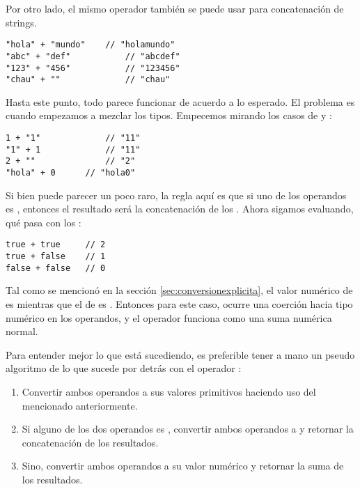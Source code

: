 Por otro lado, el mismo operador también se puede usar para concatenación de strings.

\begin{lstlisting}[title={Operador \code{+} en strings}]
"hola" + "mundo"	// "holamundo"
"abc" + "def"			// "abcdef"
"123" + "456"			// "123456"
"chau" + ""				// "chau"
\end{lstlisting}

Hasta este punto, todo parece funcionar de acuerdo a lo esperado. El problema es cuando empezamos a mezclar los tipos. Empecemos mirando los casos de  y :

\begin{lstlisting}[title={Operador \code{+} mezclando strings con números}]
1 + "1"				// "11"
"1" + 1				// "11"
2 + ""				// "2"
"hola" + 0		// "hola0"
\end{lstlisting}

Si bien puede parecer un poco raro, la regla aquí es que si uno de los operandos es , entonces el resultado será la concatenación de los . Ahora sigamos evaluando, qué pasa con los :

\begin{lstlisting}[title={Operador \code{+} en booleanos}]
true + true		// 2
true + false	// 1
false + false	// 0
\end{lstlisting}

Tal como se mencionó en la sección \ref{sec:conversionexplicita}, el valor numérico de  es  mientras que el de  es . Entonces para este caso, ocurre una coerción hacia tipo numérico en los operandos, y el operador \code{+} funciona como una suma numérica normal.

Para entender mejor lo que está sucediendo, es preferible tener a mano un pseudo algoritmo de lo que sucede por detrás con el operador \code{+}:

\begin{enumerate}
\item Convertir ambos operandos a sus valores primitivos haciendo uso del  mencionado anteriormente.
\item Si alguno de los dos operandos es , convertir ambos operandos a  y retornar la concatenación de los resultados.
\item Sino, convertir ambos operandos a su valor numérico y retornar la suma de los resultados.
\end{enumerate}

